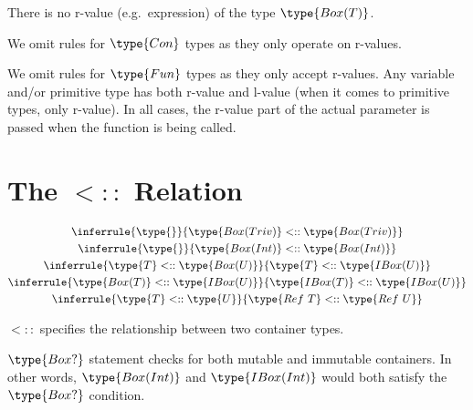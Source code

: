 \documentclass{article}
\newcommand\contsubtype{\mathrel{<::}}
\begin{document}
\medskip

There is no r-value (e.g.\ expression) of the type $\type{Box(T)}$.

\medskip

We omit rules for $\type{Con}$ types as they only operate on r-values.

\medskip

We omit rules for $\type{Fun}$ types as they only accept r-values.
Any variable and/or primitive type has both r-value and l-value (when it comes
to primitive types, only r-value). In all cases, the r-value part of the actual
parameter is passed when the function is being called.


\section*{The $\contsubtype$ Relation}

\begin{gather}
  \inferrule{\type{}}{\type{Box(Triv)} \contsubtype \type{Box(Triv)}}\\
  \inferrule{\type{}}{\type{Box(Int)} \contsubtype \type{Box(Int)}}\\
  \inferrule{\type{T} \contsubtype \type{Box(U)}}{\type{T} \contsubtype \type{IBox(U)}}\\
  \inferrule{\type{Box(T)} \contsubtype \type{IBox(U)}}{\type{IBox(T)} \contsubtype \type{IBox(U)}}\\
  \inferrule{\type{T} \contsubtype \type{U}}{\type{Ref\ T} \contsubtype \type{Ref\ U}}
\end{gather}

$\contsubtype$ specifies the relationship between two container types.

\medskip

$\type{Box?}$ statement checks for both mutable and immutable containers.
In other words, $\type{Box(Int)}$ and $\type{IBox(Int)}$ would both
satisfy the $\type{Box?}$ condition.

\end{document}

